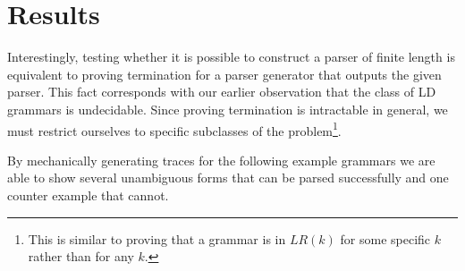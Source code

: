 \documentclass[A4]{sig-alternate}
\begin{document}
\section{Results}

Interestingly, testing whether it is possible to construct a parser of finite length is equivalent to proving termination for a parser generator that outputs the given parser.
This fact corresponds with our earlier observation that the class of LD grammars is undecidable.
Since proving termination is intractable in general, we must restrict ourselves to specific subclasses of the problem\footnote{This is similar to proving that a grammar is in $LR(k)$ for some specific $k$ rather than for any $k$.}.


By mechanically generating traces for the following example grammars we are able to show several unambiguous forms that can be parsed successfully and one counter example that cannot.
\end{document}

